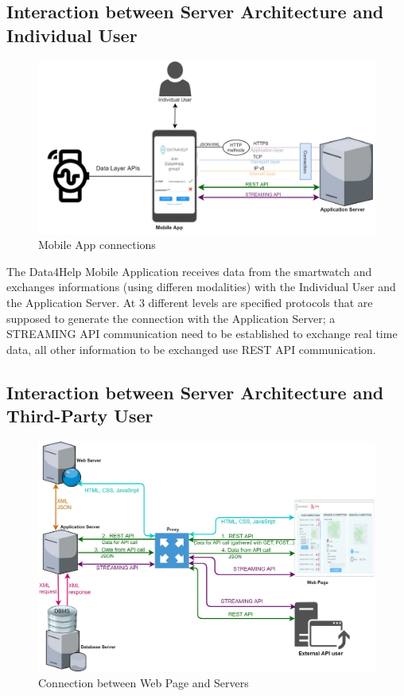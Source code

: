 \subsection{Interaction between Server Architecture and Individual User}
\begin{figure}[H]
\caption{Mobile App connections}
\includegraphics[width = \textwidth]{sections/architecturalDesign/overview_individual_user.jpg}
\end{figure}

The Data4Help Mobile Application receives data from the smartwatch and exchanges informations (using differen modalities) with the Individual User and the Application Server. 
At 3 different levels are specified protocols that are supposed to generate the connection with the Application Server; a STREAMING API communication need to be established to exchange real time data, all other information to be exchanged use REST API communication. 
 

\subsection{Interaction between Server Architecture and Third-Party User}
\begin{figure}[H]
\caption{Connection between Web Page and Servers}
\includegraphics[width = \textwidth]{sections/architecturalDesign/overview_web.jpg}
\end{figure}

